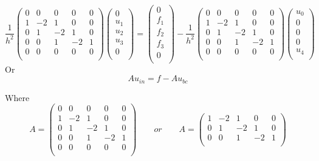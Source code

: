 \documentclass[11pt]{article}
\begin{document}
\begin{equation}
\frac{1}{h^2}
 \begin{pmatrix}
  0 &  0 &  0 &  0 &  0 \\
  1 & -2 &  1 &  0 &  0 \\
  0 &  1 & -2 &  1 &  0 \\
  0 &  0 &  1 & -2 &  1 \\
  0 &  0 &  0 &  0 &  0 \\
 \end{pmatrix}
 \begin{pmatrix}
  0 \\  u_1 \\  u_2 \\  u_3 \\  0 \\
 \end{pmatrix}
  =
 \begin{pmatrix}
  0 \\  f_1 \\  f_2 \\  f_3 \\  0 \\
 \end{pmatrix}
   -
\frac{1}{h^2}
 \begin{pmatrix}
  0 &  0 &  0 &  0 &  0 \\
  1 & -2 &  1 &  0 &  0 \\
  0 &  1 & -2 &  1 &  0 \\
  0 &  0 &  1 & -2 &  1 \\
  0 &  0 &  0 &  0 &  0 \\
 \end{pmatrix}
 \begin{pmatrix}
  u_0 \\  0 \\  0 \\  0 \\  u_4 \\
 \end{pmatrix}
\end{equation}
Or
\begin{equation}
Au_{in} = f - Au_{bc}
\end{equation}

Where
\begin{equation}
A =
 \begin{pmatrix}
  0 &  0 &  0 &  0 &  0 \\
  1 & -2 &  1 &  0 &  0 \\
  0 &  1 & -2 &  1 &  0 \\
  0 &  0 &  1 & -2 &  1 \\
  0 &  0 &  0 &  0 &  0 \\
 \end{pmatrix}
 \qquad or \qquad
A =
 \begin{pmatrix}
  1 & -2 &  1 &  0 &  0 \\
  0 &  1 & -2 &  1 &  0 \\
  0 &  0 &  1 & -2 &  1 \\
 \end{pmatrix}
\end{equation}
\end{document}
